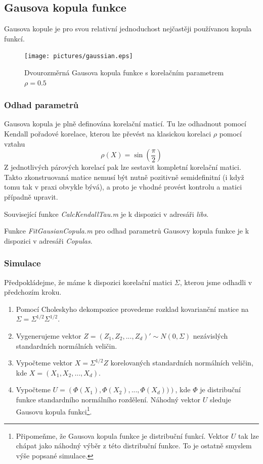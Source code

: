 \subsection{Gausova kopula funkce}

Gausova kopule je pro svou relativní jednoduchost nejčastěji používanou kopula funkcí.

\begin{figure}[htp]
\centering
\texttt{[image: pictures/gaussian.eps]}
\caption{Dvourozměrná Gausova kopula funkce s korelačním parametrem $\rho =   0.5$}
\end{figure}

\subsubsection{Odhad parametrů}

Gausova kopula je plně definována korelační maticí. Tu lze odhadnout pomocí Kendall pořadové korelace, kterou lze převést na klasickou korelaci $\rho$ pomocí vztahu
\begin{equation*}
\rho(X) = \sin\left(\frac{\pi}{2}\right)
\end{equation*}
Z jednotlivých párových korelací pak lze sestavit kompletní korelační matici. Takto zkonstruovaná matice nemusí být nutně pozitivně semidefinitní (i když tomu tak v praxi obvykle bývá), a proto je vhodné provést kontrolu a matici případně upravit.

Související funkce \textit{CalcKendallTau.m} je k dispozici v adresáři \textit{libs}.

Funkce \textit{FitGausianCopula.m} pro odhad parametrů Gausovy kopula funkce je k dispozici v adresáři \textit{Copulas}.

\subsubsection{Simulace}

Předpokládejme, že máme k dispozici korelační matici $\Sigma$, kterou jsme odhadli v předchozím kroku.

\begin{enumerate}
\item Pomocí Choleskyho dekompozice provedeme rozklad kovarianční matice na $\Sigma = \Sigma^{1/2} \Sigma^{1/2}$.
\item Vygenerujeme vektor $Z = (Z_1, Z_2, ..., Z_d)' \sim N(0, \Sigma)$ nezávislých standardních normálních veličin.
\item Vypočteme vektor $X = \Sigma^{1/2}Z$ korelovaných standardních normálních veličin, kde $X = (X_1, X_2, ..., X_d)$.
\item Vypočteme $U = \left(\Phi(X_1), \Phi(X_2), ..., \Phi(X_d)) \right)$, kde $\Phi$ je distribuční funkce standardního normálního rozdělení. Náhodný vektor $U$ sleduje Gausovu kopula funkci\footnote{Připomeňme, že Gausova kopula funkce je distribuční funkcí. Vektor $U$ tak lze chápat jako náhodný výběr z této distribuční funkce. To je ostatně smyslem výše popsané simulace.}.
\end{enumerate}

